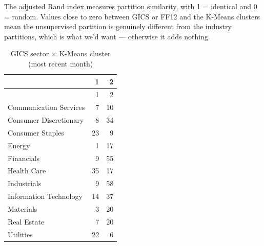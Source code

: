 \documentclass[
  letterpaper,
  DIV=11,
  numbers=noendperiod]{scrartcl}
\newenvironment{Shaded}{\begin{snugshade}}{\end{snugshade}}
\newcommand{\AttributeTok}[1]{\textcolor[rgb]{0.40,0.45,0.13}{#1}}
\newcommand{\FunctionTok}[1]{\textcolor[rgb]{0.28,0.35,0.67}{#1}}
\newcommand{\NormalTok}[1]{\textcolor[rgb]{0.00,0.23,0.31}{#1}}
\newcommand{\SpecialCharTok}[1]{\textcolor[rgb]{0.37,0.37,0.37}{#1}}
\newcommand{\StringTok}[1]{\textcolor[rgb]{0.13,0.47,0.30}{#1}}
\begin{document}
The adjusted Rand index measures partition similarity, with 1 =
identical and 0 = random. Values close to zero between GICS or FF12 and
the K-Means clusters mean the unsupervised partition is genuinely
different from the industry partitions, which is what we'd want ---
otherwise it adds nothing.

\begin{Shaded}
\end{Shaded}

\begin{longtable}[]{@{}lrr@{}}
\caption{GICS sector × K-Means cluster (most recent
month)}\tabularnewline
\toprule\noalign{}
& 1 & 2 \\
\midrule\noalign{}
\endfirsthead
\toprule\noalign{}
& 1 & 2 \\
\midrule\noalign{}
\endhead
\bottomrule\noalign{}
\endlastfoot
Communication Services & 7 & 10 \\
Consumer Discretionary & 8 & 34 \\
Consumer Staples & 23 & 9 \\
Energy & 1 & 17 \\
Financials & 9 & 55 \\
Health Care & 35 & 17 \\
Industrials & 9 & 58 \\
Information Technology & 14 & 37 \\
Materials & 3 & 20 \\
Real Estate & 7 & 20 \\
Utilities & 22 & 6 \\
\end{longtable}

\begin{Shaded}
\end{Shaded}
\end{document}
